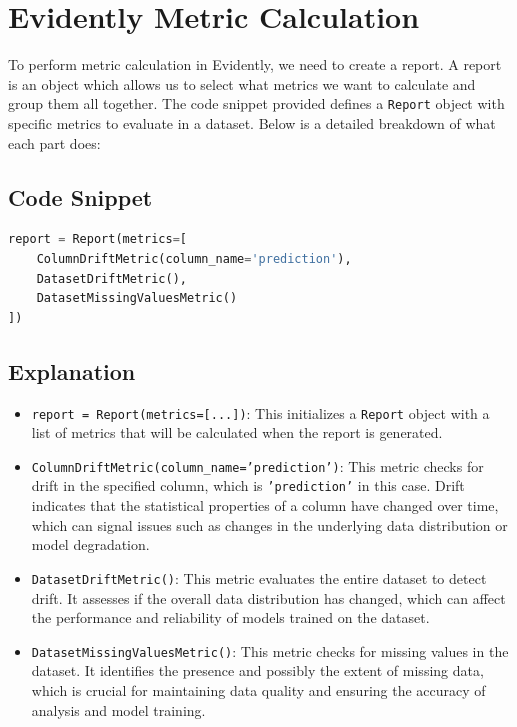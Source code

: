 \documentclass[letterpaper,12pt,notitlepage,twoside]{report}
\begin{document}
\section{Evidently Metric Calculation}
To perform metric calculation in Evidently, we need to create a report. A report is an object which allows us to select what metrics we want to calculate and group them all together. The code snippet provided defines a \texttt{Report} object with specific metrics to evaluate in a dataset. Below is a detailed breakdown of what each part does:

\subsection*{Code Snippet}
\begin{lstlisting}[language=python, numbers=none]
report = Report(metrics=[
    ColumnDriftMetric(column_name='prediction'),
    DatasetDriftMetric(),
    DatasetMissingValuesMetric()
])
\end{lstlisting}

\subsection*{Explanation}
\begin{itemize}
    \item \texttt{report = Report(metrics=[...])}: This initializes a \texttt{Report} object with a list of metrics that will be calculated when the report is generated.
    
    \item \texttt{ColumnDriftMetric(column\_name='prediction')}: This metric checks for drift in the specified column, which is \texttt{'prediction'} in this case. Drift indicates that the statistical properties of a column have changed over time, which can signal issues such as changes in the underlying data distribution or model degradation.
    
    \item \texttt{DatasetDriftMetric()}: This metric evaluates the entire dataset to detect drift. It assesses if the overall data distribution has changed, which can affect the performance and reliability of models trained on the dataset.
    
    \item \texttt{DatasetMissingValuesMetric()}: This metric checks for missing values in the dataset. It identifies the presence and possibly the extent of missing data, which is crucial for maintaining data quality and ensuring the accuracy of analysis and model training.
\end{itemize}
\end{document}
